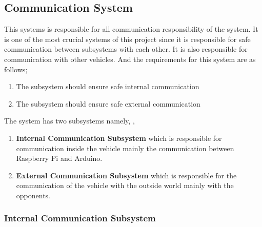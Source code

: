\documentclass[a4paper,12pt]{article}
\begin{document}


\subsection{Communication System}


This systems is responsible for all communication responsibility of the system. It is one of the most crucial systems of this project since it is responsible for safe communication between subsystems with each other. It is also responsible for communication with other vehicles.	And the requirements for this system are as follows;		


\begin{enumerate}

\item The subsystem should ensure safe internal communication

\item The subsystem should ensure safe external communication

\end{enumerate}	



The system has two subsystems namely, 	,


\begin{enumerate}

\item \textbf{Internal Communication Subsystem} which is responsible for communication inside the vehicle mainly the communication between Raspberry Pi and Arduino.						

\item \textbf{External Communication Subsystem} which is responsible for the communication of the vehicle with the outside world mainly with the opponents.

\end{enumerate}		



\subsubsection{Internal Communication Subsystem}
\end{document}
